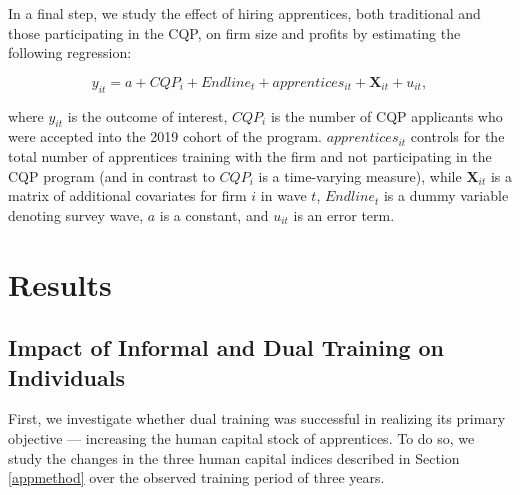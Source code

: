 \documentclass[
  a4paper, twoside, 12pt]{book}
\begin{document}
In a final step, we study the effect of hiring apprentices, both traditional and those participating in the CQP, on firm size and profits by estimating the following regression:

\[ y_{it} =  a+CQP_i+{Endline}_t+apprentices_{it}+\mathbf{X}_{it}+u_{it}, \]

where \(y_{it}\) is the outcome of interest, \(CQP_i\) is the number of CQP applicants who were accepted into the 2019 cohort of the program. \(apprentices_{it}\) controls for the total number of apprentices training with the firm and not participating in the CQP program (and in contrast to \(CQP_i\) is a time-varying measure), while \(\mathbf{X}_{it}\) is a matrix of additional covariates for firm \(i\) in wave \(t\), \({Endline}_t\) is a dummy variable denoting survey wave, \(a\) is a constant, and \(u_{it}\) is an error term.

\hypertarget{cqpresults}{%
\section{Results}\label{cqpresults}}

\hypertarget{appbenefits}{%
\subsection{Impact of Informal and Dual Training on Individuals}\label{appbenefits}}

First, we investigate whether dual training was successful in realizing its primary objective --- increasing the human capital stock of apprentices. To do so, we study the changes in the three human capital indices described in Section \ref{appmethod} over the observed training period of three years.
\end{document}
